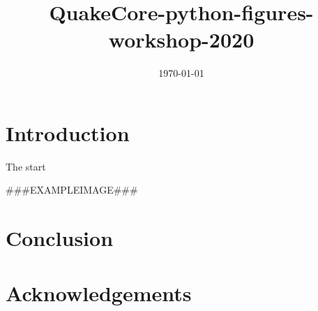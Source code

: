 \documentclass[times]{article}
\begin{document}
\title{QuakeCore-python-figures-workshop-2020}

\onecolumn

\author{}
\date{\today}

\maketitle


\tableofcontents

\newpage

\section{Introduction}

The start

###EXAMPLEIMAGE###

\section{Conclusion}

\section{Acknowledgements}



\end{document}
